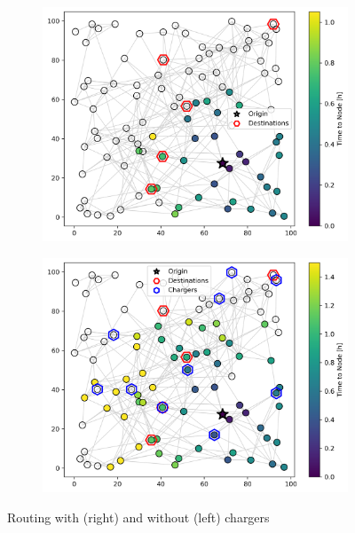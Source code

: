 \documentclass[12pt]{article}
\begin{document}
\begin{figure}[H]
	\centering
	\begin{subfigure}{.5\linewidth}
		\centering\includegraphics[width = \linewidth]{figs/routing_without_chargers.png}
	\end{subfigure}%
	\begin{subfigure}{.5\linewidth}
		\centering\includegraphics[width = \linewidth]{figs/routing_with_chargers.png}
	\end{subfigure}
	\caption{Routing with (right) and without (left) chargers}
	\label{fig:routing_chargers}
\end{figure}
\end{document}

